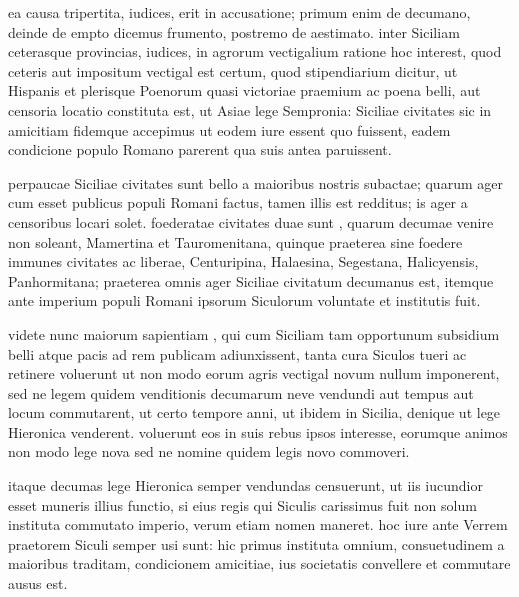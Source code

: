  ea causa tripertita, iudices, erit in accusatione; primum enim de decumano, deinde de empto dicemus frumento, postremo de aestimato. inter Siciliam ceterasque provincias, iudices, in agrorum vectigalium ratione hoc interest, quod ceteris aut impositum vectigal est certum, quod stipendiarium dicitur, ut Hispanis et plerisque Poenorum quasi victoriae praemium ac poena belli, aut censoria locatio constituta est, ut Asiae lege Sempronia: Siciliae civitates sic in amicitiam fidemque accepimus ut eodem iure essent quo fuissent, eadem condicione populo Romano parerent qua suis antea paruissent.

 perpaucae Siciliae civitates sunt bello a maioribus nostris subactae; quarum ager cum esset publicus populi Romani factus, tamen illis est redditus; is ager a censoribus locari solet. foederatae civitates duae sunt , quarum decumae venire non soleant, Mamertina et Tauromenitana, quinque praeterea sine foedere immunes civitates ac liberae, Centuripina, Halaesina, Segestana, Halicyensis, Panhormitana; praeterea omnis ager Siciliae civitatum decumanus est, itemque ante imperium populi Romani ipsorum Siculorum voluntate et institutis fuit.

 videte nunc maiorum sapientiam , qui cum Siciliam tam opportunum subsidium belli atque pacis ad rem publicam adiunxissent, tanta cura Siculos tueri ac retinere voluerunt ut non modo eorum agris vectigal novum nullum imponerent, sed ne legem quidem venditionis decumarum neve vendundi aut tempus aut locum commutarent, ut certo tempore anni, ut ibidem in Sicilia, denique ut lege Hieronica venderent. voluerunt eos in suis rebus ipsos interesse, eorumque animos non modo lege nova sed ne nomine quidem legis novo commoveri.

 itaque decumas lege Hieronica semper vendundas censuerunt, ut iis iucundior esset muneris illius functio, si eius regis qui Siculis carissimus fuit non solum instituta commutato imperio, verum etiam nomen maneret. hoc iure ante Verrem praetorem Siculi semper usi sunt: hic primus instituta omnium, consuetudinem a maioribus traditam, condicionem amicitiae, ius societatis convellere et commutare ausus est.

